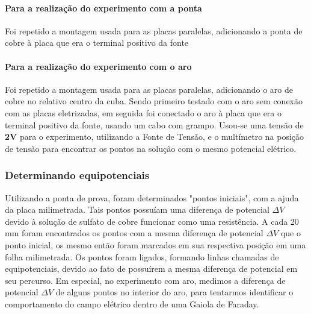             \paragraph{Para a realização do experimento com a ponta}
            Foi repetido a montagem usada para as placas paralelas, adicionando a ponta de cobre à placa que era o terminal positivo da fonte
            \paragraph{Para a realização do experimento com o aro}
            Foi repetido a montagem usada para as placas paralelas, 
            adicionando o aro de cobre no relativo centro da cuba. 
            Sendo primeiro testado com o aro sem conexão com as 
            placas eletrizadas, em seguida foi conectado o aro à 
            placa que era o terminal positivo da fonte, 
            usando um cabo com grampo.
            \newline
            \newline
            Usou-se uma tensão de \textbf{2V} 
            para o experimento, utilizando a Fonte de Tensão, 
            e o multímetro na posição de tensão para encontrar os 
            pontos na solução com o mesmo potencial elétrico. 
        \subsubsection{Determinando equipotenciais}
            Utilizando a ponta de prova, foram determinados
            "pontos iniciais", com a ajuda da placa milimetrada. 
            Tais pontos possuíam uma diferença de potencial 
            $\Delta V$ devido à solução de sulfato de cobre 
            funcionar como uma resistência. A cada 20 mm foram
            encontrados os pontos com a mesma diferença de 
            potencial $\Delta V$ que o ponto inicial, os mesmo 
            então foram marcados em sua respectiva posição em 
            uma folha milimetrada. Os pontos foram ligados, 
            formando linhas chamadas de equipotenciais, 
            devido ao fato de possuírem a mesma diferença 
            de potencial em seu percurso.
            \newline
            \newline
            Em especial, no experimento com aro, medimos a 
            diferença de potencial $\Delta V$ de alguns pontos no 
            interior do aro, para tentarmos identificar o 
            comportamento do campo elétrico dentro de uma 
            Gaiola de Faraday.

